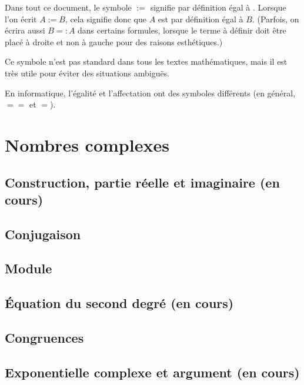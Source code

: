 \documentclass[11pt,a4paper,oneside]{book}
\theoremstyle{definition}
\theoremstyle{plain}
\begin{document}
Dans tout ce document, le symbole \og $:=$\fg{} signifie \og par définition égal à \fg. Lorsque l'on écrit $A:=B$, cela signifie donc que $A$ est par définition égal à $B$. (Parfois, on écrira aussi $B=:A$  dans certains formules, lorsque le terme à définir doit être placé à droite et non à gauche pour des raisons esthétiques.)

Ce symbole n'est pas standard dans tous les textes mathématiques, mais il est très utile pour éviter des situations ambiguës.

\begin{remarque}
En informatique, l'égalité et l'affectation ont des symboles différents (en général, \og$==$\fg{} et \og$=$\fg). 
\end{remarque}

\chapter{Nombres complexes}


\section{Construction, partie réelle et imaginaire (en cours)}
\label{sec:construction}




\section{Conjugaison}
\label{sec:conjugaison}



\section{Module}
\label{sec:module}


\section{Équation du second degré (en cours)}
\label{sec:second_degre}


\section{Congruences}
\label{sec:congruences}


\section{Exponentielle complexe et argument (en cours)}
\label{sec:exp}

\end{document}
